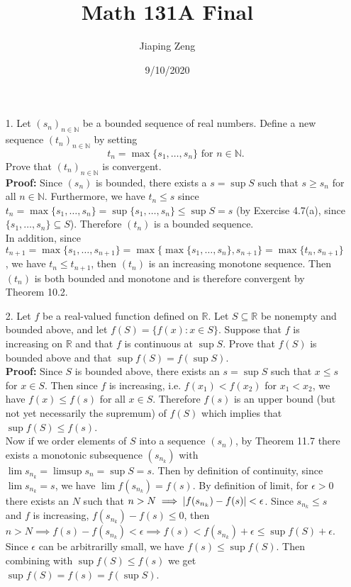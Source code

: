 \documentclass{article}
\title{Math 131A Final}
\author{Jiaping Zeng}
\date{9/10/2020}
\begin{document}

\begin{itemize}
    \item [1.] Let $(s_n)_{n\in\mathbb{N}}$ be a bounded sequence of real numbers. Define a new sequence $(t_n)_{n\in\mathbb{N}}$ by setting \[t_n=\max\{s_1,\ldots,s_n\}\text{ for }n\in\mathbb{N}.\] Prove that $(t_n)_{n\in\mathbb{N}}$ is convergent.\\\textbf{Proof: } Since $(s_n)$ is bounded, there exists a $s=\sup S$ such that $s\geq s_n$ for all $n\in\mathbb{N}$. Furthermore, we have $t_n\leq s$ since $t_n=\max\{s_1,\ldots,s_n\}=\sup\{s_1,\ldots,s_n\}\leq\sup S=s$ (by Exercise 4.7(a), since $\{s_1,\ldots,s_n\}\subseteq S$). Therefore $(t_n)$ is a bounded sequence.\\In addition, since $t_{n+1}=\max\{s_1,\ldots,s_{n+1}\}=\max\{\max\{s_1,\ldots,s_n\},s_{n+1}\}=\max\{t_n,s_{n+1}\}$, we have $t_n\leq t_{n+1}$, then $(t_n)$ is an increasing monotone sequence. Then $(t_n)$ is both bounded and monotone and is therefore convergent by Theorem 10.2.
\end{itemize}

\newpage
\begin{itemize}
    \item [2.] Let $f$ be a real-valued function defined on $\mathbb{R}$. Let $S\subseteq\mathbb{R}$ be nonempty and bounded above, and let $f(S)=\{f(x):x\in S\}$. Suppose that $f$ is increasing on $\mathbb{R}$ and that $f$ is continuous at $\sup S$. Prove that $f(S)$ is bounded above and that $\sup f(S)=f(\sup S)$.\\\textbf{Proof: } Since $S$ is bounded above, there exists an $s=\sup S$ such that $x\leq s$ for $x\in S$. Then since $f$ is increasing, i.e. $f(x_1)<f(x_2)$ for $x_1<x_2$, we have $f(x)\leq f(s)$ for all $x\in S$. Therefore $f(s)$ is an upper bound (but not yet necessarily the supremum) of $f(S)$ which implies that $\sup f(S)\leq f(s)$.\\
          Now if we order elements of $S$ into a sequence $(s_n)$, by Theorem 11.7 there exists a monotonic subsequence $(s_{n_k})$ with $\lim s_{n_k}=\limsup s_n=\sup S=s$. Then by definition of continuity, since $\lim s_{n_k}=s$, we have $\lim f(s_{n_k})=f(s)$. By definition of limit, for $\epsilon>0$ there exists an $N$ such that $n>N\implies\abs{f(s_{n_k})-f(s)}<\epsilon$. Since $s_{n_k}\leq s$ and $f$ is increasing, $f(s_{n_k})-f(s)\leq0$, then $n>N\implies f(s)-f(s_{n_k})<\epsilon\implies f(s)<f(s_{n_k})+\epsilon\leq\sup f(S)+\epsilon$. Since $\epsilon$ can be arbitrarilly small, we have $f(s)\leq\sup f(S)$. Then combining with $\sup f(S)\leq f(s)$ we get $\sup f(S)=f(s)=f(\sup S)$.
\end{itemize}
\end{document}
